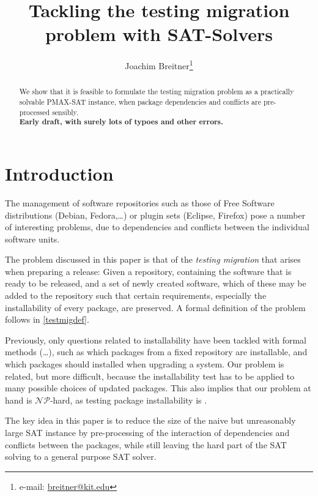 \documentclass[halfparskip,11pt]{scrartcl}
\author{Joachim Breitner\footnote{e-mail: \href{mailto:breitner@kit.edu}{breitner@kit.edu}}}
\title{Tackling the testing migration problem with SAT-Solvers}
\begin{document}
\maketitle



\begin{abstract}
We show that it is feasible to formulate the testing migration problem as a practically solvable PMAX-SAT instance, when package dependencies and conflicts are pre-processed sensibly.\\

\centering
\textbf{Early draft, with surely lots of typoes and other errors.}
\end{abstract}

\tableofcontents

\section{Introduction}

The management of software repositories such as those of Free Software distributions (Debian, Fedora,\dots) or plugin sets (Eclipse, Firefox) pose a number of interesting problems, due to dependencies and conflicts between the individual software units.

The problem discussed in this paper is that of the \emph{testing migration} that arises when preparing a release: Given a repository, containing the software that is ready to be released, and a set of newly created software, which of these may be added to the repository such that certain requirements, especially the installability of every package, are preserved. A formal definition of the problem follows in \ref{testmigdef}.

Previously, only questions related to installability have been tackled with formal methods (\cite{edos}\dots), such as which packages from a fixed repository are installable, and which packages should installed when upgrading a system. Our problem is related, but more difficult, because the installability test has to be applied to many possible choices of updated packages. This also implies that our problem at hand is $\mathcal{NP}$-hard, as testing package installability is \cite{burrows}.

The key idea in this paper is to reduce the size of the naive but unreasonably large SAT instance by pre-processing of the interaction of dependencies and conflicts between the packages, while still leaving the hard part of the SAT solving to a general purpose SAT solver.
\end{document}
